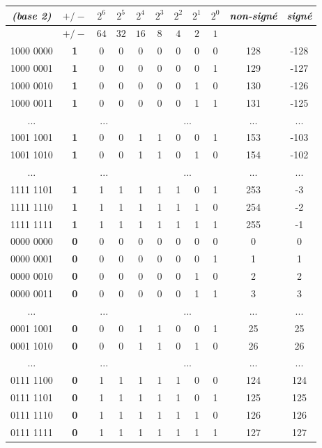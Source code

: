 \documentclass[11pt,a4paper]{article}
\begin{document}
\begin{center}
\begin{tabular}{ | c | c c c c | c c c c | c | c |}
\hline
\textit{(base 2)} & $ +/- $ & $ 2^6 $ & $ 2^5 $ & $ 2^4 $   &   $ 2^3 $ & $ 2^2 $ & $ 2^1 $ & $ 2^0 $ & \textit{non-signé} & \textit{signé} \\
\hline
         & $ +/- $ & $  64 $ & $  32 $ & $  16 $   &   $   8 $ & $   4 $ & $   2 $ & $   1 $ &       & \\
\hline
1000 0000  &  \textbf{1} & 0 & 0 & 0  &  0 & 0 & 0 & 0   & 128 & -128 \\
1000 0001  &  \textbf{1} & 0 & 0 & 0  &  0 & 0 & 0 & 1   & 129 & -127 \\
1000 0010  &  \textbf{1} & 0 & 0 & 0  &  0 & 0 & 1 & 0   & 130 & -126 \\
1000 0011  &  \textbf{1} & 0 & 0 & 0  &  0 & 0 & 1 & 1   & 131 & -125 \\
... & \multicolumn{4}{c|}{...} & \multicolumn{4}{c|}{...} & ... & ... \\
1001 1001  &  \textbf{1} & 0 & 0 & 1  &  1 & 0 & 0 & 1   & 153 & -103 \\
1001 1010  &  \textbf{1} & 0 & 0 & 1  &  1 & 0 & 1 & 0   & 154 & -102 \\
... & \multicolumn{4}{c|}{...} & \multicolumn{4}{c|}{...} & ... & ... \\
1111 1101  &  \textbf{1} & 1 & 1 & 1  &  1 & 1 & 0 & 1   & 253 & -3 \\
1111 1110  &  \textbf{1} & 1 & 1 & 1  &  1 & 1 & 1 & 0   & 254 & -2 \\
1111 1111  &  \textbf{1} & 1 & 1 & 1  &  1 & 1 & 1 & 1   & 255 & -1 \\
0000 0000  &  \textbf{0} & 0 & 0 & 0  &  0 & 0 & 0 & 0   &   0 & 0 \\
0000 0001  &  \textbf{0} & 0 & 0 & 0  &  0 & 0 & 0 & 1   &   1 & 1 \\
0000 0010  &  \textbf{0} & 0 & 0 & 0  &  0 & 0 & 1 & 0   &   2 & 2 \\
0000 0011  &  \textbf{0} & 0 & 0 & 0  &  0 & 0 & 1 & 1   &   3 & 3 \\
... & \multicolumn{4}{c|}{...} & \multicolumn{4}{c|}{...} & ... & ... \\
0001 1001  &  \textbf{0} & 0 & 0 & 1  &  1 & 0 & 0 & 1   &  25 & 25 \\
0001 1010  &  \textbf{0} & 0 & 0 & 1  &  1 & 0 & 1 & 0   &  26 & 26 \\
... & \multicolumn{4}{c|}{...} & \multicolumn{4}{c|}{...} & ... & ... \\
0111 1100  &  \textbf{0} & 1 & 1 & 1  &  1 & 1 & 0 & 0   & 124 & 124 \\
0111 1101  &  \textbf{0} & 1 & 1 & 1  &  1 & 1 & 0 & 1   & 125 & 125 \\
0111 1110  &  \textbf{0} & 1 & 1 & 1  &  1 & 1 & 1 & 0   & 126 & 126 \\
0111 1111  &  \textbf{0} & 1 & 1 & 1  &  1 & 1 & 1 & 1   & 127 & 127 \\
\hline
\end{tabular}
\end{center}
\end{document}

